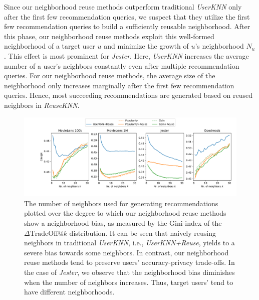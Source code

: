 \documentclass[manuscript,review,anonymous]{acmart}
\begin{document}
Since our neighborhood reuse methods outperform traditional \emph{UserKNN} only after the first few recommendation queries, we suspect that they utilize the first few recommendation queries to build a sufficiently reusable neighborhood.
After this phase, our neighborhood reuse methods exploit this well-formed neighborhood of a target user $u$ and minimize the growth of $u$'s neighborhood $N_u$.
This effect is most prominent for \emph{Jester}.
Here, \emph{UserKNN} increases the average number of a user's neighbors constantly even after multiple recommendation queries.
For our neighborhood reuse methods, the average size of the neighborhood only increases marginally after the first few recommendation queries. 
Hence, most succeeding recommendations are generated based on reused neighbors in \emph{ReuseKNN}.

\begin{figure}[!t]
    \centering
    \includegraphics[width=\linewidth]{figures/gini.pdf}
    \caption{The number of neighbors used for generating recommendations plotted over the degree to which our neighborhood reuse methods show a neighborhood bias, as measured by the Gini-index of the $\Delta \text{TradeOff}@k$ distribution. 
    It can be seen that naively reusing neighbors in traditional \emph{UserKNN}, i.e., \emph{UserKNN+Reuse}, yields to a severe bias towards some neighbors.
    In contrast, our neighborhood reuse methods tend to preserve users' accuracy-privacy trade-offs. In the case of \emph{Jester}, we observe that the neighborhood bias diminishes when the number of neighbors increases. Thus, target users' tend to have different neighborhoods.
    }
    \label{fig:results_gini}
\end{figure}
\end{document}

